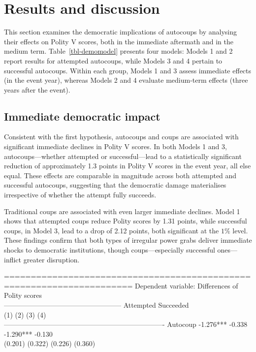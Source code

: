\documentclass[
  12pt,
]{report}
\begin{document}
\section{Results and discussion}\label{results-and-discussion-1}

This section examines the democratic implications of autocoups by
analysing their effects on Polity V scores, both in the immediate
aftermath and in the medium term. Table~\ref{tbl-demomodel} presents
four models: Models 1 and 2 report results for attempted autocoups,
while Models 3 and 4 pertain to successful autocoups. Within each group,
Models 1 and 3 assess immediate effects (in the event year), whereas
Models 2 and 4 evaluate medium-term effects (three years after the
event).

\subsection*{Immediate democratic
impact}\label{immediate-democratic-impact}

Consistent with the first hypothesis, autocoups and coups are associated
with significant immediate declines in Polity V scores. In both Models 1
and 3, autocoups---whether attempted or successful---lead to a
statistically significant reduction of approximately 1.3 points in
Polity V scores in the event year, all else equal. These effects are
comparable in magnitude across both attempted and successful autocoups,
suggesting that the democratic damage materialises irrespective of
whether the attempt fully succeeds.

Traditional coups are associated with even larger immediate declines.
Model 1 shows that attempted coups reduce Polity scores by 1.31 points,
while successful coups, in Model 3, lead to a drop of 2.12 points, both
significant at the \(1\%\) level. These findings confirm that both types
of irregular power grabs deliver immediate shocks to democratic
institutions, though coups---especially successful ones---inflict
greater disruption.

======================================================================
Dependent variable: Differences of Polity scores\\
--------------------------------------------------- Attempted
Succeeded\\
(1) (2) (3) (4)\\
----------------------------------------------------------------------
Autocoup -1.276*** -0.338 -1.290*** -0.130\\
(0.201) (0.322) (0.226) (0.360)
\end{document}
